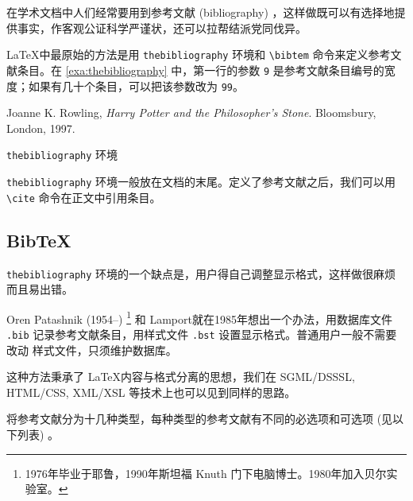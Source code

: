 在学术文档中人们经常要用到参考文献 (bibliography) ，这样做既可以有选择地提供事实，作客观公证科学严谨状，还可以拉帮结派党同伐异。

\LaTeX 中最原始的方法是用 
\texttt{thebibliography} 环境和 \verb|\bibtem| 命令来定义参考文献条目。在 \autoref{exa:thebibliography} 中，第一行的参数 \texttt{9} 是参考文献条目编号的宽度；如果有几十个条目，可以把该参数改为 \texttt{99}。

\begin{example}[h]
\begin{BTDemo}[]
\begin{thebibliography}{9}
    Joanne K. Rowling,
    \emph{Harry Potter and the Philosopher's Stone}.
    Bloomsbury, London,
    1997.
\end{thebibliography}
\end{BTDemo}
\caption{\texttt{thebibliography} 环境}
\label{exa:thebibliography}
\end{example}

\texttt{thebibliography} 环境一般放在文档的末尾。定义了参考文献之后，我们可以用 \verb|\cite| 命令在正文中引用条目。

\begin{RLDemo}[numbers=none]
\cite{Rowling_1997}
\end{RLDemo}

\subsection{BibTeX}

\texttt{thebibliography} 环境的一个缺点是，用户得自己调整显示格式，这样做很麻烦而且易出错。

Oren Patashnik (1954--)\indexPatashnik{} \footnote{1976年毕业于耶鲁，1990年斯坦福 Knuth 门下电脑博士。1980年加入贝尔实验室。} 和 Lamport\indexLamport 就在1985年想出一个办法，用数据库文件 \texttt{.bib} 记录参考文献条目，用样式文件 \texttt{.bst} 设置显示格式。普通用户一般不需要改动 样式文件，只须维护数据库。

这种方法秉承了 \LaTeX 内容与格式分离的思想，我们在 SGML/DSSSL, HTML/CSS, XML/XSL 等技术上也可以见到同样的思路。

\BibTeX 将参考文献分为十几种类型，每种类型的参考文献有不同的必选项和可选项 (见以下列表) 。

